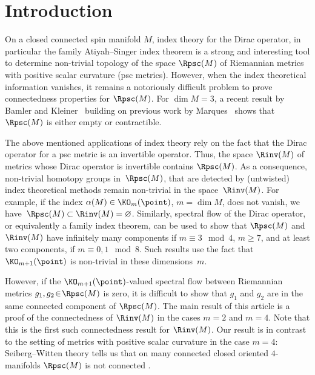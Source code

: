 \section{Introduction}

On a closed connected spin manifold $M$, index theory for the Dirac operator, in particular the family Atiyah--Singer index theorem is a strong and interesting tool to determine non-trivial topology of the space $\Rpsc(M)$ of Riemannian metrics with positive scalar curvature (psc metrics). However, when the index theoretical information vanishes, it remains a notoriously difficult problem to prove connectedness properties for $\Rpsc(M)$. For $\dim M=3$, a recent result by Bamler and Kleiner~\cite{bamler.kleiner:2019p} building on previous work by Marques~\cite{marques:2012} shows that $\Rpsc(M)$ is either empty or contractible.

The above mentioned applications of index theory rely on the fact that the Dirac operator for a psc metric is an invertible operator. Thus, the space $\Rinv(M)$ of metrics whose Dirac operator is invertible contains $\Rpsc(M)$. As a consequence, non-trivial homotopy groups in~$\Rpsc(M)$, that are detected by (untwisted) index theoretical methods remain non-trivial in the space~$\Rinv(M)$. For example, if the index $\alpha(M)\in \KO_m(\point)$, $m=\dim M$, does not vanish, we have~${\Rpsc(M)\subset\Rinv(M)=\varnothing}$. Similarly, spectral flow of the Dirac operator, or equivalently a family index theorem, can be used to show that $\Rpsc(M)$ and $\Rinv(M)$ have infinitely many components if $m\equiv 3 \mod 4$, $m\geq 7$, and at least two components, if $m\equiv 0,1\mod 8$. Such results use the fact that $\KO_{m+1}(\point)$ is non-trivial in these dimensions~$m$.

However, if the $\KO_{m+1}(\point)$-valued spectral flow between Riemannian metrics $g_1,g_2\!\in\! \Rpsc(M)$ is zero, it is difficult to show that $g_1$ and $g_2$ are in the same connected component of $\Rpsc(M)$. The main result of this article is a proof of the connectedness of $\Rinv(M)$ in the cases $m=2$ and $m=4$. Note that this is the first such connectedness result for $\Rinv(M)$. Our result is in contrast to the setting of metrics with positive scalar curvature in the case $m=4$: Seiberg--Witten theory tells us that on many connected closed oriented $4$-manifolds $\Rpsc(M)$ is not connected \cite[Sections~5 and~6]{ruberman:2001}.

